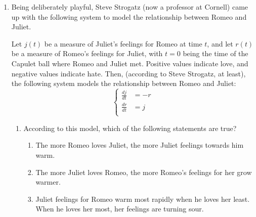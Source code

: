 \documentclass[main]{subfiles}
\begin{document}
\begin{enumerate}
\begin{enumerate}
\begin{solution}
    In general, an {\bf equilibrium} of a system of two differential equations is a 
    pair of constant functions (one for each dependent variable) that simultaneously
    satisfies both differential equations.
  \end{solution}

\end{enumerate}


  
  
    \pspace{\newpage}
  

    \item 
  Being deliberately playful, Steve Strogatz (now a professor at Cornell)
  came up with the following system to model the relationship between
  Romeo and Juliet.

  Let $j(t)$ be a measure of Juliet's feelings for Romeo at time $t$, and
  let $r(t)$ be a measure of Romeo's feelings for Juliet, with $t = 0$
  being the time of the Capulet ball where Romeo and Juliet met.  Positive
  values indicate love, and negative values indicate hate.  Then,
  (according to Steve Strogatz, at least), the following system models the
  relationship between Romeo and Juliet:
  \[ \left\{
  \begin{aligned}
  \frac{dj}{dt} &= -r \\
  \frac{dr}{dt} &= j \\
  \end{aligned} \right.\]
  \begin{enumerate}
    \item

    
    \begin{problem}[0.5in]
    According to this model, which of the following statements are true? 
    \begin{enumerate}[topsep=0pt,itemsep=0pt]
    \item The more Romeo loves Juliet, the more Juliet feelings towards him warm.
   
    \item The more Juliet loves Romeo, the more Romeo's feelings for her grow warmer.

    \item Juliet feelings for Romeo warm most rapidly when he loves her least.
    When he loves her most, her feelings are turning sour. 
  \end{enumerate}
  \end{problem}


\end{enumerate}
\end{enumerate}
\end{document}
